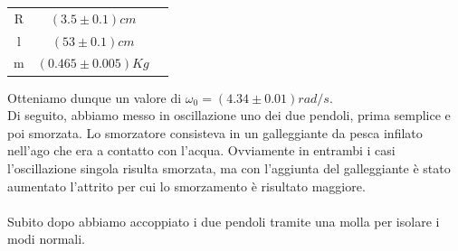\documentclass{article}
\begin{document}
\begin{tabular}{ccc}
    \toprule
    R & $(3.5 \pm 0.1) cm$ \\
    l & $(53 \pm 0.1)cm$\\
    m & $(0.465 \pm 0.005)Kg$\\
    \bottomrule
\end{tabular} 

Otteniamo dunque un valore di $\omega_0 = (4.34 \pm 0.01) rad/s$.\\
Di seguito, abbiamo messo in oscillazione uno dei due pendoli, prima semplice e poi smorzata. Lo smorzatore consisteva in un galleggiante da pesca infilato nell'ago che era a contatto con l'acqua. Ovviamente in entrambi i casi l'oscillazione singola risulta smorzata, ma con l'aggiunta del galleggiante è stato aumentato l'attrito per cui lo smorzamento è risultato maggiore.\\
\\
Subito dopo abbiamo accoppiato i due pendoli tramite una molla per isolare i modi normali.
\end{document}
